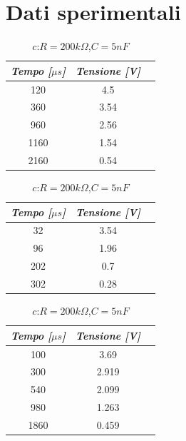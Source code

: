     \section{Dati sperimentali}

    \begin{table} [!htb]
        \begin{minipage}{.32\linewidth}
            \caption{$a$:$R = 10k\Omega$,$C = 100nF$}
            \centering
            \begin{tabular}{|c|c|c|}
                \hline
                \textit{Tempo [$\mu s$]} & \textit{Tensione [V]} \\
                \hline
                120 & 4.5 \\
                \hline
                360 & 3.54 \\
                \hline
                960 & 2.56 \\
                \hline
                1160 & 1.54 \\
                \hline
                2160 & 0.54 \\
                \hline
            \end{tabular}
        \end{minipage}
        \begin{minipage}{.32\linewidth}
            \caption{$b$:$R = 10k\Omega$,$C = 10nF$}
            \centering
            \begin{tabular}{|c|c|c|}
                \hline
                \textit{Tempo [$\mu s$]} & \textit{Tensione [V]} \\
                \hline
                32 & 3.54 \\
                \hline
                96 & 1.96 \\
                \hline
                202 & 0.7 \\
                \hline
                302 & 0.28 \\
                \hline
            \end{tabular}
        \end{minipage}
        \begin{minipage}{.32\linewidth}
            \caption{$c$:$R = 200k\Omega$,$C = 5nF$}
            \centering
            \begin{tabular}{|c|c|c|}
                \hline
                \textit{Tempo [$\mu s$]} & \textit{Tensione [V]} \\
                \hline
                100 & 3.69 \\
                \hline
                300 & 2.919 \\
                \hline
                540 & 2.099 \\
                \hline
                980 & 1.263 \\
                \hline
                1860 & 0.459 \\
                \hline
            \end{tabular}
        \end{minipage}
        
    \end{table}

